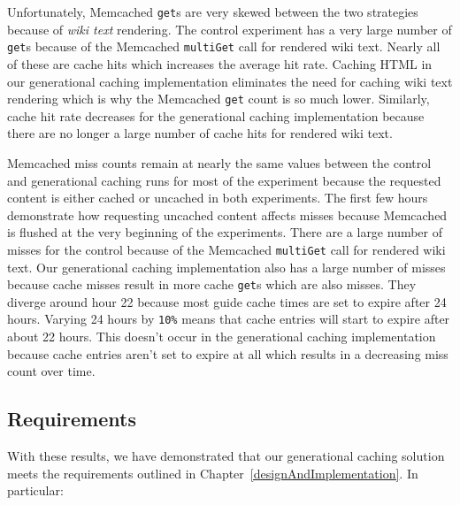 \documentclass[12pt]{ucthesis}
\begin{document}
Unfortunately, \textsf{Memcached} {\tt get}s are very skewed between the two strategies because of \textit{wiki text} rendering.
The control experiment has a very large number of {\tt get}s because of the \textsf{Memcached} {\tt multiGet} call for rendered wiki text.
Nearly all of these are cache hits which increases the average hit rate.
Caching HTML in our generational caching implementation eliminates the need for caching wiki text rendering which is why the \textsf{Memcached} {\tt get} count is so much lower.
Similarly, cache hit rate decreases for the generational caching implementation because there are no longer a large number of cache hits for rendered wiki text.

\textsf{Memcached} miss counts remain at nearly the same values between the control and generational caching runs for most of the experiment because the requested content is either cached or uncached in both experiments.
The first few hours demonstrate how requesting uncached content affects misses because \textsf{Memcached} is flushed at the very beginning of the experiments.
There are a large number of misses for the control because of the \textsf{Memcached} {\tt multiGet} call for rendered wiki text.
Our generational caching implementation also has a large number of misses because cache misses result in more cache {\tt get}s which are also misses.
They diverge around hour 22 because most guide cache times are set to expire after 24 hours.
Varying 24 hours by {\tt 10\%} means that cache entries will start to expire after about 22 hours.
This doesn't occur in the generational caching implementation because cache entries aren't set to expire at all which results in a decreasing miss count over time.

\subsection{Requirements}
With these results, we have demonstrated that our generational caching solution meets the requirements outlined in Chapter~\ref{designAndImplementation}.
In particular:
\end{document}

